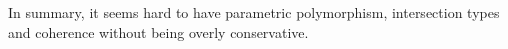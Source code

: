 In summary, it seems hard to have parametric polymorphism, intersection 
types and coherence without being overly conservative. 


\begin{comment}
\subsection{Intersection Types in Existing Languages}

What is an intersection type? The intersection of types $A$ and $B$
contains exactly those values which can be used as either of type $A$
or of type $B$.  Just as not all intersection of sets are nonempty,
not all intersections of types are inhabited.  For example, the
intersection of a base type $\tyint$ and a function type
$\tyint \to \tyint$ is not inhabited.\bruno{put this text somewhere?}

Since then various researchers have
studied intersection types, and some languages have adopted in one
form or another. However, while intersection types are already used
in various languages, the lack of a merge operator removes
considerable expressiveness.


A number of OO languages, such as
Java, C\#, Scala, and Ceylon\footnote{\url{http://ceylon-lang.org/}},
already support intersection types to different degrees. Intersection
types are particularly relevant for OOP as they can be used to model
multiple interface inheritance. In Java, for example,

\begin{lstlisting}
interface AwithB extends A, B {}
\end{lstlisting}

\noindent introduces a new interface \lstinline{AwithB} that satisfies the interfaces of
both \lstinline{A} and \lstinline{B}. Arguably such type can be considered as a nominal
intersection type. Scala takes one step further by eliminating the
need of a nominal type. For example, given two concrete traits, it is possible to
use \emph{mixin composition} to create an object that implements both
traits. Such an object has a (structural) intersection type:

\begin{lstlisting}
trait A
trait B

val newAB : A with B = new A with B
\end{lstlisting}

\noindent Scala also allows intersection of type parameters. For example:
\begin{lstlisting}
def merge[A,B] (x: A) (y: B) : A with B = ...
\end{lstlisting}
uses the annonymous intersection of two type parameters \lstinline{A} and
\lstinline{B}. However, in Scala it is not possible to dynamically
compose two objects. For example, the following code:


\end{comment}
